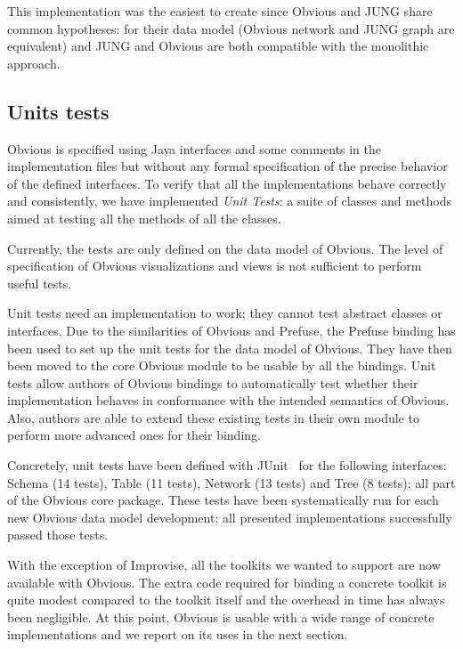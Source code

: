 This implementation was the easiest to create since Obvious and JUNG
share common hypotheses: for their data model (Obvious network and
JUNG graph are equivalent) and JUNG and Obvious are both compatible
with the monolithic approach.  


\subsection{Units tests}
\label{sub:unittests}

Obvious is specified using Java interfaces and some comments in the
implementation files but without any formal specification of the
precise behavior of the defined interfaces.  To verify that all the
implementations behave correctly and consistently, we have implemented
\emph{Unit Tests}: a suite of classes and methods aimed at testing all
the methods of all the classes.

Currently, the tests are only defined on the data model of Obvious.
The level of specification of Obvious visualizations and views is not
sufficient to perform useful tests.

Unit tests need an implementation to work; they cannot test abstract
classes or interfaces.  Due to the similarities of Obvious and
Prefuse, the Prefuse binding has been used to set up the unit tests
for the data model of Obvious.  They have then been moved to the core
Obvious module to be usable by all the bindings.  Unit tests allow
authors of Obvious bindings to automatically test whether their
implementation behaves in conformance with the intended semantics of
Obvious.  Also, authors are able to extend these existing tests in
their own module to perform more advanced ones for their binding.

Concretely, unit tests have been defined with JUnit~\cite{JUnit} for
the following interfaces: Schema (14 tests), Table (11 tests), Network
(13 tests) and Tree (8 tests); all part of the Obvious core package.
These tests have been systematically run for each new Obvious data
model development: all presented implementations successfully passed
those tests.



With the exception of Improvise, all the toolkits we wanted to support
are now available with Obvious.  The extra code required for binding a
concrete toolkit is quite modest compared to the toolkit itself and
the overhead in time has always been negligible.  At this point,
Obvious is usable with a wide range of concrete implementations and we
report on its uses in the next section.

